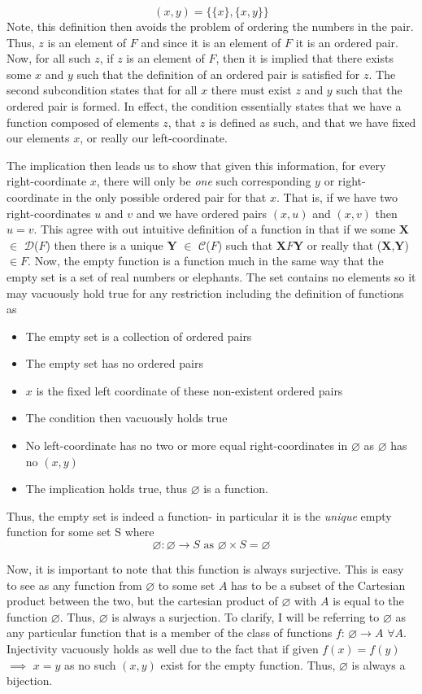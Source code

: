 \documentclass{article}
\begin{document}
\[
(x,y) = \{\{x\}, \{x,y\}\}
\]
Note, this definition then avoids the problem of ordering the numbers in the pair. Thus, $z$ is an element of $F$ and since it is an element of $F$ it is an ordered pair. Now, for all such $z$, if $z$ is an element of $F$, then it is implied that there exists some $x$ and $y$ such that the definition of an ordered pair is satisfied for $z$. The second subcondition states that for all $x$ there must exist $z$ and $y$ such that the ordered pair is formed. In effect, the condition essentially states that we have a function composed of elements $z$, that $z$ is defined as such, and that we have fixed our elements $x$, or really our left-coordinate.
\par The implication then leads us to show that given this information, for every right-coordinate $x$, there will only be \textit{one} such corresponding $y$ or right-coordinate in the only possible ordered pair for that $x$. That is, if we have two right-coordinates $u$ and $v$ and we have ordered pairs $(x,u)$ and $(x,v)$ then $u=v$. This agree with out intuitive definition of a function in that if we some $\mathbf{X}$ $\in$ $\mathcal{D}$($F$) then there is a unique $\mathbf{Y}$ $\in$ $\mathcal{C}$($F$) such that $\mathbf{X}$$F$$\mathbf{Y}$ or really that ($\mathbf{X}$,$\mathbf{Y}$) $\in F$. Now, the empty function is a function much in the same way that the empty set is a set of real numbers or elephants. The set contains no elements so it may vacuously hold true for any restriction including the definition of functions as 
\begin{itemize}
\item The empty set is a collection of ordered pairs
\item The empty set has no ordered pairs
\item $x$ is the fixed left coordinate of these non-existent ordered pairs
\item The condition then vacuously holds true
\item No left-coordinate has no two or more equal right-coordinates in $\varnothing$ as $\varnothing$ has no $(x,y)$
\item The implication holds true, thus $\varnothing$ is a function.
\end{itemize}
\par Thus, the empty set is indeed a function- in particular it is the \textit{unique} empty function for some set S where
\[
\varnothing: \varnothing \to S \text{ as } \varnothing \times S = \varnothing
\]
\par Now, it is important to note that this function is always surjective. This is easy to see as any function from $\varnothing$ to some set $A$ has to be a subset of the Cartesian product between the two, but the cartesian product of $\varnothing$ with $A$ is equal to the function $\varnothing$. Thus, $\varnothing$ is always a surjection. To clarify, I will be referring to $\varnothing$ as any particular function that is a member of the class of functions $f$: $\varnothing \to A$ \text{} $\forall A$. Injectivity vacuously holds as well due to the fact that if given $f(x)=f(y)$ $\implies$ $x=y$ as no such $(x,y)$ exist for the empty function. Thus, $\varnothing$ is always a bijection. 
\end{document}
